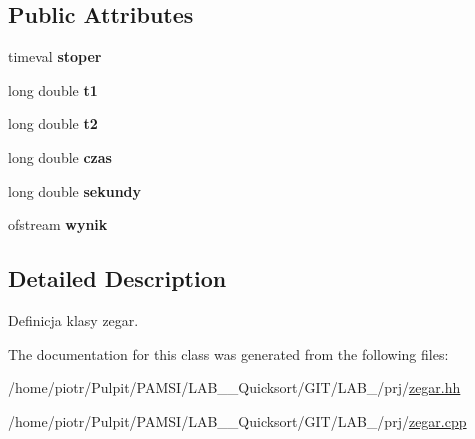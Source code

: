 \subsection*{\-Public \-Attributes}
\begin{DoxyCompactItemize}
\item 
\hypertarget{classzegar_a4c16d3b27f74dc7760b8a23269a20a7b}{timeval {\bfseries stoper}}\label{classzegar_a4c16d3b27f74dc7760b8a23269a20a7b}

\item 
\hypertarget{classzegar_aafb4ae592701809482f334fb0d3e55bf}{long double {\bfseries t1}}\label{classzegar_aafb4ae592701809482f334fb0d3e55bf}

\item 
\hypertarget{classzegar_ac32f1b83ea11b875ba4356afba430581}{long double {\bfseries t2}}\label{classzegar_ac32f1b83ea11b875ba4356afba430581}

\item 
\hypertarget{classzegar_a2249608c9a5286bba25e22a8d607dc5c}{long double {\bfseries czas}}\label{classzegar_a2249608c9a5286bba25e22a8d607dc5c}

\item 
\hypertarget{classzegar_ae51c387a5599badba9221824ae75b1de}{long double {\bfseries sekundy}}\label{classzegar_ae51c387a5599badba9221824ae75b1de}

\item 
\hypertarget{classzegar_ab52ebd6c7d2692754d05935d9b777be9}{ofstream {\bfseries wynik}}\label{classzegar_ab52ebd6c7d2692754d05935d9b777be9}

\end{DoxyCompactItemize}


\subsection{\-Detailed \-Description}
\-Definicja klasy zegar. 



\-The documentation for this class was generated from the following files\-:\begin{DoxyCompactItemize}
\item 
/home/piotr/\-Pulpit/\-P\-A\-M\-S\-I/\-L\-A\-B\-\_\-\_\-\-Quicksort/\-G\-I\-T/\-L\-A\-B\-\_/prj/\hyperlink{zegar_8hh}{zegar.\-hh}\item 
/home/piotr/\-Pulpit/\-P\-A\-M\-S\-I/\-L\-A\-B\-\_\-\_\-\-Quicksort/\-G\-I\-T/\-L\-A\-B\-\_/prj/\hyperlink{zegar_8cpp}{zegar.\-cpp}\end{DoxyCompactItemize}
